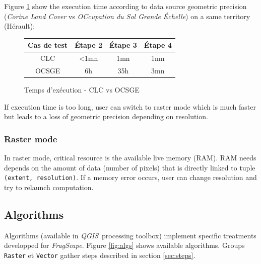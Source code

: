 \documentclass[11pt]{article}
\newcommand{\tool}{\emph{FragScape}}
\newcommand{\qgis}{\emph{QGIS}}
\begin{document}
Figure \ref{fig:benchOS} show the execution time according to data source geometric precision (\emph{Corine Land Cover} vs \emph{OCcupation du Sol Grande Échelle}) on a same territory (Hérault):

\begin{figure}[h!]
\begin{center}
\begin{tabular}{|c|ccc|}
    \hline
    Cas de test & Étape 2 & Étape 3 & Étape 4\\
    \hline
    CLC & <1mn & 1mn & 1mn \\
    OCSGE & 6h & 35h & 3mn \\
    \hline
\end{tabular}
\end{center}
\vspace*{-0.5cm}
\caption{Temps d'exécution - CLC vs OCSGE}
\label{fig:benchOS}
\end{figure}

If execution time is too long, user can switch to raster mode which is much faster but leads to a loss of geometric precision depending on resolution.

\subsubsection{Raster mode}

In raster mode, critical resource is the available live memory (RAM). RAM needs depends on the amount of data (number of pixels) that is directly linked to tuple \texttt{(extent, resolution)}. If a memory error occurs, user can change resolution and try to relaunch computation. 





\subsection{Algorithms}
\label{sec:algs}

Algorithms (available in \qgis\ processing toolbox) implement specific treatments developped for \tool. Figure \ref{fig:algs} shows available algorithms. Groups \texttt{Raster} et \texttt{Vector} gather steps described in section \ref{sec:steps}.
\end{document}
